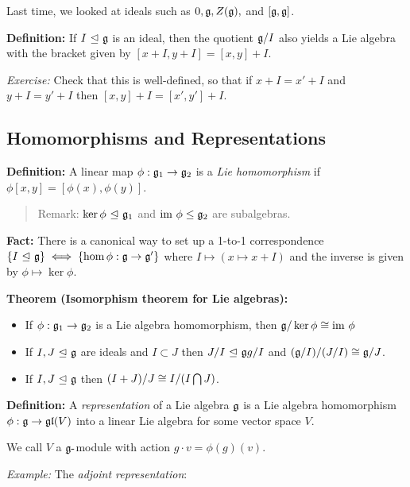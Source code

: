 Last time, we looked at ideals such as \(0, {\mathfrak{g}}, Z({\mathfrak{g}}),\) and
\([{\mathfrak{g}}, {\mathfrak{g}}]\).

\textbf{Definition:} If \(I {~\trianglelefteq~} {\mathfrak{g}}\) is an ideal, then the
quotient \({\mathfrak{g}}/I\) also yields a Lie algebra with the bracket given by
\([x+I, y+I] = [x,y] + I\).

\emph{Exercise:} Check that this is well-defined, so that if
\(x + I = x' + I\) and \(y+I = y' + I\) then
\([x,y] + I = [x', y'] + I\).

\hypertarget{homomorphisms-and-representations}{%
\subsection{Homomorphisms and
Representations}\label{homomorphisms-and-representations}}

\textbf{Definition:} A linear map \(\phi: {\mathfrak{g}}_{1} \to {\mathfrak{g}}_{2}\) is a
\emph{Lie homomorphism} if \(\phi[x,y] = [\phi(x), \phi(y)]\).

\begin{quote}
Remark: \(\ker \phi {~\trianglelefteq~} {\mathfrak{g}}_{1}\) and \({\text{im}~}\phi \leq {\mathfrak{g}}_{2}\)
are subalgebras.
\end{quote}

\textbf{Fact:} There is a canonical way to set up a 1-to-1
correspondence
\(\left\{{I {~\trianglelefteq~} {\mathfrak{g}}}\right\} \iff \left\{{\hom \phi: {\mathfrak{g}} \to {\mathfrak{g}}'}\right\}\)
where \(I \mapsto (x \mapsto x + I)\) and the inverse is given by
\(\phi \mapsto \ker \phi\).

\textbf{Theorem (Isomorphism theorem for Lie algebras):}

\begin{itemize}
\tightlist
\item
  If \(\phi: {\mathfrak{g}}_{1} \to {\mathfrak{g}}_{2}\) is a Lie algebra homomorphism,
  then \({\mathfrak{g}}/\ker\phi \cong {\text{im}~} \phi\)
\item
  If \(I,J {~\trianglelefteq~} {\mathfrak{g}}\) are ideals and \(I \subset J\) then
  \(J/I {~\trianglelefteq~} {\mathfrak{g}} g/I\) and \(({\mathfrak{g}}/I)/(J/I) \cong {\mathfrak{g}}/J\).
\item
  If \(I, J {~\trianglelefteq~} {\mathfrak{g}}\) then \((I+J)/J \cong I/(I\bigcap J)\).
\end{itemize}

\textbf{Definition:} A \emph{representation} of a Lie algebra \({\mathfrak{g}}\)
is a Lie algebra homomorphism \(\phi:{\mathfrak{g}} \to {\mathfrak{gl}}(V)\) into a linear
Lie algebra for some vector space \(V\).

We call \(V\) a \({\mathfrak{g}}{\hbox{-}}\)module with action
\(g\cdot v = \phi(g)(v)\).

\emph{Example:} The \emph{adjoint representation}:

